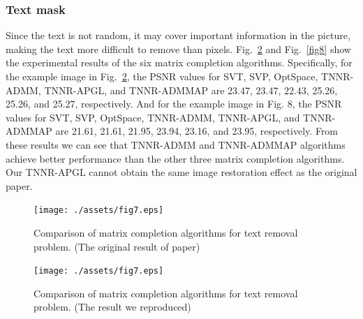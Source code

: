 \documentclass{article}
\begin{document}
{\subsubsection{Text mask}
\label{text}

Since the text is not random, it may cover important information in the picture, making the text more difficult to remove than pixels. Fig.~\ref{fig7} and Fig.~\ref{fig8} show the experimental results of the six matrix
completion algorithms. Specifically, for the example image
in Fig.~\ref{fig7}, the PSNR values for SVT, SVP, OptSpace, TNNR-
ADMM, TNNR-APGL, and TNNR-ADMMAP are 23.47,
23.47, 22.43, 25.26, 25.26, and 25.27, respectively. And for the
example image in Fig. 8, the PSNR values for SVT, SVP,
OptSpace, TNNR-ADMM, TNNR-APGL, and TNNR-ADMMAP are 21.61, 21.61, 21.95, 23.94, 23.16, and 23.95, respectively. 
From these results we can see that TNNR-ADMM and TNNR-ADMMAP algorithms achieve better performance than the other three matrix completion algorithms. Our TNNR-APGL cannot obtain the same image restoration effect as the original paper.

\begin{figure}[ht]
	\centering
	\texttt{[image: ./assets/fig7.eps]}
	\caption{Comparison of matrix completion algorithms for text removal problem. (The original result of paper)}
	\label{fig7ori}
\end{figure}
\begin{figure}[ht]
	\centering
	\texttt{[image: ./assets/fig7.eps]}
	\caption{Comparison of matrix completion algorithms for text removal problem. (The result we reproduced)}
	\label{fig7}
\end{figure}

}
\end{document}
